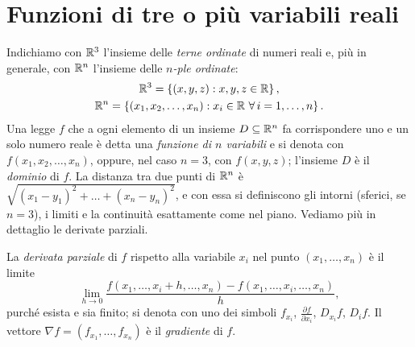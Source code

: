 \section{Funzioni di tre o più variabili reali}
\label{sec:n-variabili}

Indichiamo con $\mathbb{R}^{3}$ l'insieme delle \emph{terne ordinate} di numeri reali e, più in
generale, con $\mathbb{R}^{n}$ l'insieme delle \emph{$n$-ple ordinate}:
\begin{equation}\label{eq:Rn}
\begin{gathered}
  \mathbb{R}^{3}=\left\{ (x,y,z) : x,y,z\in\mathbb{R} \right\},\\
  \mathbb{R}^{n}=\left\{ (x_{1},x_{2},\dots,x_{n}) : x_{i}\in\mathbb{R}\ \forall\, i=1,\dots,n \right\}.
\end{gathered}
\end{equation}
Una legge $f$ che a ogni elemento di un insieme $D\subseteq\mathbb{R}^{n}$ fa corrispondere uno e
un solo numero reale è detta una \emph{funzione di $n$ variabili} e si denota con
$f(x_{1},x_{2},\dots,x_{n})$, oppure, nel caso $n=3$, con $f(x,y,z)$; l'insieme $D$ è il
\emph{dominio} di $f$. La distanza tra due punti di $\mathbb{R}^{n}$ è
$\sqrt{(x_{1}-y_{1})^{2}+\dots+(x_{n}-y_{n})^{2}}$, e con essa si definiscono gli intorni
(sferici, se $n=3$), i limiti e la continuità esattamente come nel piano. Vediamo più in
dettaglio le derivate parziali.

\begin{definizione}\label{def:parziali-n}
La \emph{derivata parziale} di $f$ rispetto alla variabile $x_{i}$ nel punto
$(x_{1},\dots,x_{n})$ è il limite
\begin{equation}\label{eq:parziale-n}
  \lim_{h\to0}\frac{f(x_{1},\dots,x_{i}+h,\dots,x_{n})-f(x_{1},\dots,x_{i},\dots,x_{n})}{h},
\end{equation}
purché esista e sia finito; si denota con uno dei simboli $f_{x_{i}}$,
$\frac{\partial f}{\partial x_{i}}$, $D_{x_{i}}f$, $D_{i}f$. Il vettore
$\nabla f=(f_{x_{1}},\dots,f_{x_{n}})$ è il \emph{gradiente} di $f$.
\end{definizione}

